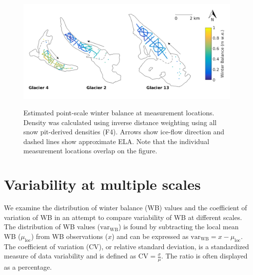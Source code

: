 \documentclass{sfuthesis}
\begin{document}
\begin{figure}
	\centering
	\includegraphics[width =\textwidth]{SWEmap_opt9.png}\\
	\caption{Estimated point-scale winter balance at measurement locations. Density was calculated using inverse distance weighting using all snow pit-derived densities (F4). Arrows show ice-flow direction and dashed lines show approximate ELA. Note that the individual measurement locations overlap on the figure.}
	\label{fig:SWEmap_F4}
\end{figure}


\section{Variability at multiple scales}

We examine the distribution of winter balance (WB) values and the coefficient of variation of WB in an attempt to compare variability of WB at different scales. The distribution of WB values ($\mathrm{var}_{\mathrm{WB}}$) is found by subtracting the local mean WB ($\mu_\mathrm{loc}$) from WB observations ($x$) and can be expressed as $\mathrm{var}_{\mathrm{WB}} = x-\mu_{\mathrm{loc}}$. The coefficient of variation (CV), or relative standard deviation, is a standardized measure of data variability and is defined as $\mathrm{CV} = \frac{\sigma}{\mu}$. The ratio is often displayed as a percentage.
\end{document}
